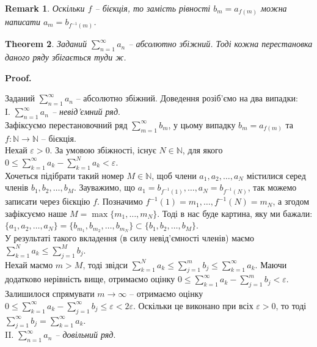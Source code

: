 \documentclass[a4paper, 10pt]{article}
\makeatletter
\theoremstyle{theoremdd}
\newtheorem{theorem}{Theorem}[subsection]
\theoremstyle{theoremdd}
\theoremstyle{theoremdd}
\theoremstyle{theoremdd}
\theoremstyle{theoremdd}
\theoremstyle{theoremdd}
\theoremstyle{theoremdd}
\newtheorem{remark}[theorem]{Remark}
\theoremstyle{theoremdd}
\theoremstyle{theoremdd}
\renewenvironment{proof}[1][Proof.\\]{\par
\pushQED{\hfill \qed}%
\normalfont \topsep6\p@\@plus6\p@\relax
\trivlist
\item\relax
{\bfseries
#1\@addpunct{.}}\hspace\labelsep\ignorespaces
}{%
\popQED\endtrivlist\@endpefalse
}
\makeatother
\begin{document}
\begin{remark}
Оскільки $f$ -- бієкція, то замість рівності $b_m = a_{f(m)}$ можна написати $a_m = b_{f^{-1}(m)}$.
\end{remark}

\begin{theorem}
Заданий $\displaystyle \sum_{n=1}^\infty a_n$ -- абсолютно збіжний. Тоді кожна перестановка даного ряду збігається туди ж.
\end{theorem}

\begin{proof}
Заданий $\displaystyle \sum_{n=1}^\infty a_n$ -- абсолютно збіжний. Доведення розіб'ємо на два випадки:\\
I. \textit{$\displaystyle\sum_{n=1}^\infty a_n$ -- невід'ємний ряд}.\\
Зафіксуємо перестановочний ряд $\displaystyle\sum_{m=1}^\infty b_m$, у цьому випадку $b_m = a_{f(m)}$ та $f \colon \mathbb{N} \to \mathbb{N}$ -- бієкція.\\
Нехай $\varepsilon > 0$. За умовою збіжності, існує $N \in \mathbb{N}$, для якого $0 \leq \displaystyle\sum_{k=1}^\infty a_k - \sum_{k=1}^N a_k < \varepsilon$.\\
Хочеться підібрати такий номер $M \in \mathbb{N}$, щоб члени $a_1,a_2,\dots,a_N$ містилися серед членів $b_1,b_2,\dots,b_M$. Зауважимо, що $a_1 = b_{f^{-1}(1)},\dots,a_N = b_{f^{-1}(N)}$, так можемо записати через бієкцію $f$. Позначимо $f^{-1}(1) = m_1,\dots,f^{-1}(N) = m_N$, а згодом зафіксуємо наше $M = \max\{m_1,\dots,m_N\}$. Тоді в нас буде картина, яку ми бажали:\\
$\{a_1,a_2,\dots,a_N\} = \{b_{m_1}, b_{m_2},\dots, b_{m_N}\} \subset \{b_1,b_2,\dots,b_M\}$.\\
У результаті такого вкладення (в силу невід'ємності членів) маємо $\displaystyle\sum_{k=1}^N a_k \leq \sum_{j=1}^M b_j$.\\
Нехай маємо $m > M$, тоді звідси $\displaystyle\sum_{k=1}^N a_k \leq \sum_{j=1}^m b_j \leq \sum_{k=1}^\infty a_k$. Маючи додатково нерівність вище, отримаємо оцінку $0 \leq \displaystyle\sum_{k=1}^\infty a_k - \sum_{j=1}^m b_j < \varepsilon$. Залишилося спрямувати $m \to \infty$ -- отримаємо оцінку $\displaystyle 0 \leq \sum_{k=1}^\infty a_k - \sum_{j=1}^\infty b_j \leq \varepsilon < 2 \varepsilon$. Оскільки це виконано при всіх $\varepsilon > 0$, то тоді $\displaystyle\sum_{j=1}^\infty b_j = \sum_{k=1}^\infty a_k$.
\bigskip \\
II. \textit{$\displaystyle\sum_{n=1}^\infty a_n$ -- довільний ряд}.\\

\end{proof}
\end{document}
